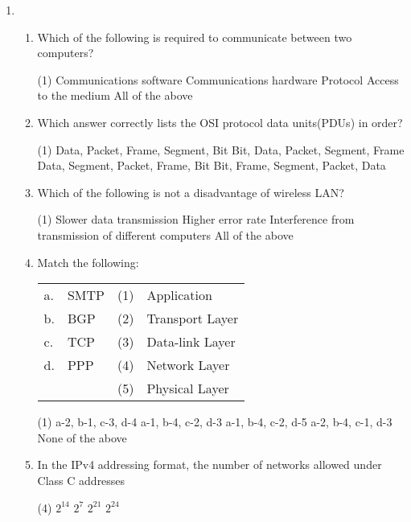\documentclass{exmppr}
\begin{document}
\begin{enumerate}
\item \begin{enumerate}
\item Which of the following is required to communicate between two computers?
\begin{tasks}(1)
\task Communications software
\task Communications hardware
\task Protocol
\task Access to the medium
\task All of the above
\end{tasks}

\item Which answer correctly lists the OSI protocol data units(PDUs) in order?
\begin{tasks}(1)
\task Data, Packet, Frame, Segment, Bit
\task Bit, Data, Packet, Segment, Frame
\task Data, Segment, Packet, Frame, Bit
\task Bit, Frame, Segment, Packet, Data
\end{tasks}

\item Which of the following is not a disadvantage of wireless LAN?
\begin{tasks}(1)
\task Slower data transmission
\task Higher error rate
\task Interference from transmission of different computers
\task All of the above
\end{tasks}

\item Match the following:\\
\begin{center}
\begin{tabular}{llll}
a.&SMTP&(1)&Application\\
b.&BGP&(2)&Transport Layer\\
c.&TCP&(3)&Data-link Layer\\
d.&PPP&(4)&Network Layer\\
&&(5)&Physical Layer
\end{tabular}
\begin{tasks}(1)
\task a-2, b-1, c-3, d-4
\task a-1, b-4, c-2, d-3
\task a-1, b-4, c-2, d-5
\task a-2, b-4, c-1, d-3
\task None of the above
\end{tasks}
\end{center}

\item In the IPv4 addressing format, the number of networks allowed under Class C addresses
\begin{tasks}(4)
\task $2^{14}$
\task $2^{7}$
\task $2^{21}$
\task $2^{24}$
\end{tasks}


\end{enumerate}
\end{enumerate}
\end{document}
